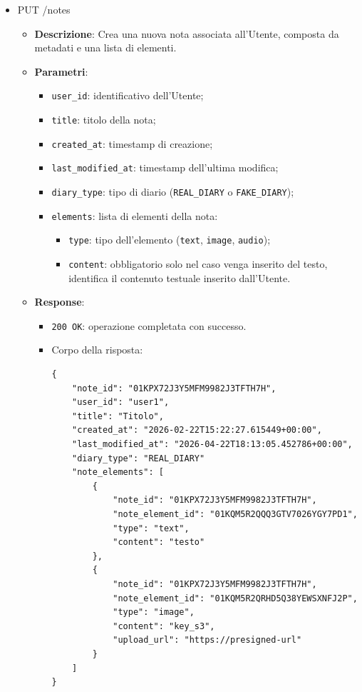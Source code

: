 \documentclass[a4paper,12pt]{article}
\newcommand{\code}[1]{{\ttfamily\textcolor{purple!85!black}{#1}}}
\begin{document}
\begin{itemize}
    \item \code{PUT /notes}
        \begin{itemize}
            \item \textbf{Descrizione}: Crea una nuova nota associata all’Utente, composta da metadati e una lista di elementi.

            \item \textbf{Parametri}:
            \begin{itemize}
                \item \texttt{user\_id}: identificativo dell'Utente;
                \item \texttt{title}: titolo della nota;
                \item \texttt{created\_at}: timestamp di creazione;
                \item \texttt{last\_modified\_at}: timestamp dell'ultima modifica;
                \item \texttt{diary\_type}: tipo di diario (\texttt{REAL\_DIARY} o \texttt{FAKE\_DIARY});
                \item \texttt{elements}: lista di elementi della nota:
                \begin{itemize}
                    \item \texttt{type}: tipo dell'elemento (\texttt{text}, \texttt{image}, \texttt{audio});
                    \item \texttt{content}: obbligatorio solo nel caso venga inserito del testo, identifica il contenuto testuale inserito dall'Utente.
                \end{itemize}
            \end{itemize}

            \item \textbf{Response}:
            \begin{itemize}
                \item \texttt{200 OK}: operazione completata con successo.
                \item Corpo della risposta:
\begin{verbatim}
{
    "note_id": "01KPX72J3Y5MFM9982J3TFTH7H",
    "user_id": "user1",
    "title": "Titolo",
    "created_at": "2026-02-22T15:22:27.615449+00:00",
    "last_modified_at": "2026-04-22T18:13:05.452786+00:00",
    "diary_type": "REAL_DIARY"
    "note_elements": [
        {
            "note_id": "01KPX72J3Y5MFM9982J3TFTH7H",
            "note_element_id": "01KQM5R2QQQ3GTV7026YGY7PD1",
            "type": "text",
            "content": "testo"
        },
        {
            "note_id": "01KPX72J3Y5MFM9982J3TFTH7H",
            "note_element_id": "01KQM5R2QRHD5Q38YEWSXNFJ2P",
            "type": "image",
            "content": "key_s3",
            "upload_url": "https://presigned-url"
        }
    ]
}
\end{verbatim}
            \end{itemize}


\end{itemize}
\end{itemize}
\end{document}
